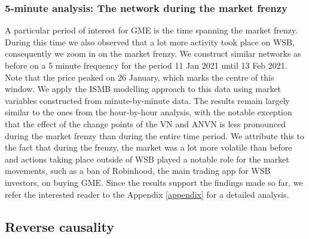 \subsubsection{5-minute analysis: The network during the market frenzy}
\label{sec:5minby5min}


A particular period of interest for GME is the time spanning the market frenzy. During this time we also observed that a lot more activity took place on WSB, consequently we zoom in on the market frenzy. We construct similar networks as before on a 5 minute frequency for the period 11 Jan 2021 until 13 Feb 2021. Note that the price peaked on 26 January, which marks the centre of this window. We apply the ISMB modelling approach to this data using market variables constructed from minute-by-minute data. %
The results remain largely similar to the ones from the hour-by-hour analysis, with the notable exception that the effect of the change points of the VN and ANVN is less pronounced during the market frenzy than during the entire time period. We attribute this to the fact that during the frenzy, the market was a lot more volatile than before and actions taking place outside of WSB played a notable role for the market movements, such as a ban of Robinhood, the main trading app for WSB investors, on buying GME. Since the results support the findings made so far, we refer the interested reader to the Appendix \ref{appendix} for a detailed analysis.



\subsection{Reverse causality}
\label{reverse_causality}

